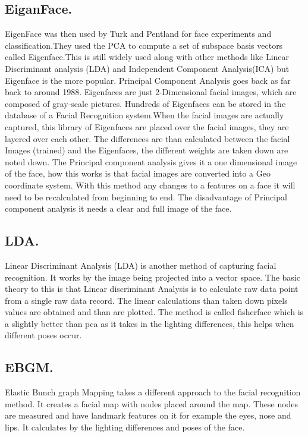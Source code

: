 \documentclass[report]{IEEEtran}
\begin{document}
\subsection{EiganFace.}
EigenFace was then used by Turk and Pentland for face experiments and classification.They used the PCA to compute a set of subspace basis vectors called Eigenface.This is still widely used along with other methods like Linear Discriminant analysis (LDA) and Independent Component Analysis(ICA) but Eigenface is the more popular.
Principal Component Analysis goes back as far back to around 1988. Eigenfaces are just 2-Dimensional facial images, which are composed of gray-scale pictures\cite{eigen}.
Hundreds of Eigenfaces can be stored in the database of a Facial Recognition system.When the facial images are actually captured, this library of Eigenfaces are placed over the facial images, they are layered over each other. The differences are than calculated between the facial Images (trained) and the Eigenfaces, the different weights are taken down are noted down. The Principal component analysis gives it a one dimensional image of the face, how this works is that facial images are converted into a Geo coordinate system. With this method any changes to a features on a face it will need to be recalculated from beginning to end. The disadvantage of Principal component analysis it needs a clear and full image of the face\cite{pca}.     

\subsection{LDA.}
Linear Discriminant Analysis (LDA) is another method of capturing facial recognition. It works by the image being projected into a vector space. The basic theory to this is that Linear discriminant Analysis is to calculate raw data point from a single raw data record. The linear calculations than taken down pixels values are obtained and than are plotted. The method is called fisherface which is a slightly better than pca as it takes in the lighting differences, this helps when different poses occur\cite{pca}.

\subsection{EBGM.}
Elastic Bunch graph Mapping takes a different approach to the facial recognition method. It creates a facial map with nodes placed around the map. These nodes are measured and have landmark features on it for example the eyes, nose and lips. It calculates by the lighting differences and poses of the face\cite{methods}.
\end{document}
